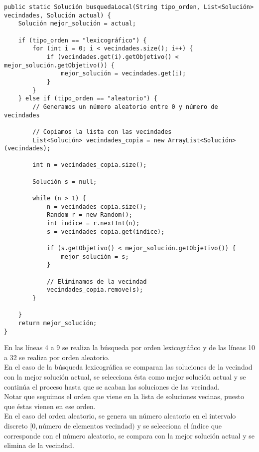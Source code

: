 \documentclass[12pt,a4paper,twoside,openright,titlepage,final]{article}
\begin{document}
\begin{verbatim}
public static Solución busquedaLocal(String tipo_orden, List<Solución> vecindades, Solución actual) {
    Solución mejor_solución = actual;

    if (tipo_orden == "lexicográfico") {
        for (int i = 0; i < vecindades.size(); i++) {
            if (vecindades.get(i).getObjetivo() < mejor_solución.getObjetivo()) {
                mejor_solución = vecindades.get(i);
            }
        }
    } else if (tipo_orden == "aleatorio") {
        // Generamos un número aleatorio entre 0 y número de vecindades

        // Copiamos la lista con las vecindades
        List<Solución> vecindades_copia = new ArrayList<Solución>(vecindades);

        int n = vecindades_copia.size();

        Solución s = null;

        while (n > 1) {
            n = vecindades_copia.size();
            Random r = new Random();
            int indice = r.nextInt(n);
            s = vecindades_copia.get(indice);

            if (s.getObjetivo() < mejor_solución.getObjetivo()) {
                mejor_solución = s;
            }

            // Eliminamos de la vecindad
            vecindades_copia.remove(s);
        }

    }
    return mejor_solución;
}
\end{verbatim} 

En las líneas 4 a 9 se realiza la búsqueda por orden lexicográfico y de las líneas 10 a 32 se realiza por orden aleatorio.\\
En el caso de la búsqueda lexicográfica se comparan las soluciones de la vecindad con la mejor solución actual, se selecciona ésta como mejor solución actual y se continúa el proceso hasta que se acaban las soluciones de las vecindad.\\
Notar que seguimos el orden que viene en la lista de soluciones vecinas, puesto que éstas vienen en ese orden.\\
En el caso del orden aleatorio, se genera un número aleatorio en el intervalo discreto $[0, \text{número de elementos vecindad})$ y se selecciona el índice que corresponde con el número aleatorio, se compara con la mejor solución actual y se elimina de la vecindad.\\
\end{document}
